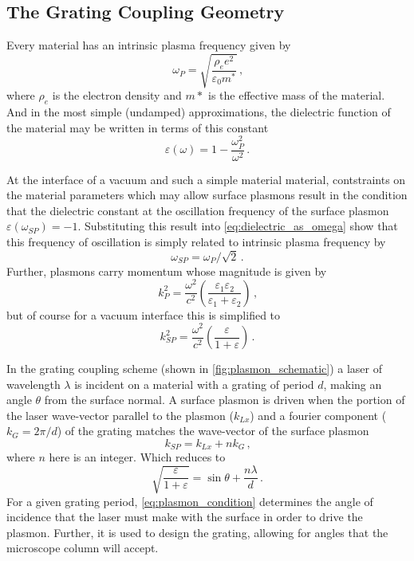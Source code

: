 \subsection{The Grating Coupling Geometry}

Every material has an intrinsic plasma frequency given by 
\begin{equation}
  \omega_{P} = \sqrt{\frac{\rho_{e} e^2}{\varepsilon_{0} m^*}} \,\text{,}
\end{equation}
where $\rho_{e}$ is the electron density and $m*$ is the effective mass of the material.
And in the most simple (undamped) approximations, the dielectric function of the material may be written in terms of this constant
\begin{equation} \label{eq:dielectric_as_omega}
  \varepsilon(\omega) = 1 - \frac{ \omega_{P}^2 }{ \omega^2 } \,\text{.}
\end{equation}

At the interface of a vacuum and such a simple material material, contstraints on the material parameters which may allow surface plasmons result in the condition that the dielectric constant at the oscillation frequency of the surface plasmon $ \varepsilon(\omega_{SP}) = -1 $.
Substituting this result into \ref{eq:dielectric_as_omega} show that this frequency of oscillation is simply related to intrinsic plasma frequency by
\begin{equation}
  \omega_{SP} = \omega_{P} / \sqrt{2} \,\text{.}
\end{equation}
Further, plasmons carry momentum whose magnitude is given by
\begin{equation}
  k_{P}^2 = \frac{\omega^2}{c^2} \left( \frac{\varepsilon_{1} \varepsilon_{2}}{\varepsilon_{1} + \varepsilon_{2}} \right) \,\text{,}
\end{equation}
but of course for a vacuum interface this is simplified to 
\begin{equation}
  k_{SP}^2 = \frac{\omega^2}{c^2} \left( \frac{ \varepsilon }{ 1 + \varepsilon } \right) \,\text{.}
\end{equation}

In the grating coupling scheme (shown in \ref{fig:plasmon_schematic}) a laser of wavelength $\lambda$ is incident on a material with a grating of period $d$, making an angle $\theta$ from the surface normal. A surface plasmon is driven when the portion of the laser wave-vector parallel to the plasmon ($k_{Lx}$) and a fourier component ($k_{G} = 2 \pi / d$) of the grating matches the wave-vector of the surface plasmon
\begin{equation}
  k_{SP} = k_{Lx} + n k_{G} \,\text{,}
\end{equation}
where $n$ here is an integer.
Which reduces to 
\begin{equation} \label{eq:plasmon_condition}
  \sqrt{ \frac{ \varepsilon }{ 1 + \varepsilon } } = \sin \theta + \frac{ n \lambda }{ d } \,\text{.}
\end{equation}
For a given grating period, \ref{eq:plasmon_condition} determines the angle of incidence that the laser must make with the surface in order to drive the plasmon.
Further, it is used to design the grating, allowing for angles that the microscope column will accept.

